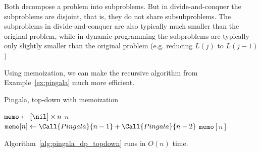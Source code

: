 \begin{remark}\label{rem:dp_vs_divide_and_conquer} 
Both decompose a problem into subproblems.
But in divide-and-conquer the subproblems are disjoint, that is, they do not share subsubproblems.
The subproblems in divide-and-conquer are also typically much smaller than the original problem, while in dynamic programming the subproblems are typically only slightly smaller than the original problem (e.g. reducing \(L(j)\) to \(L(j-1)\))
\end{remark}



\begin{example}[Pingala]\label{ex:pingala_dp}
Using memoization, we can make the recursive algorithm from Example~\ref{ex:pingala} much more efficient.


\begin{algorithm}[htb] 
    \caption{Pingala, top-down with memoization}
    \label{alg:pingala_dp_topdown}
  \begin{algorithmic}[1]
    \State $\mathtt{memo} \gets [\nil] \times n$ 
     
        \State \Return $n$
      \EndIf
        \State $\mathtt{memo}[n] \gets \Call{Pingala}{n-1} + \Call{Pingala}{n-2}$
      \EndIf
      \State \Return $\mathtt{memo}[n]$
    \EndFunction
  \end{algorithmic}
\end{algorithm}


Algorithm~\ref{alg:pingala_dp_topdown} runs in $O(n)$ time.
\end{example}






